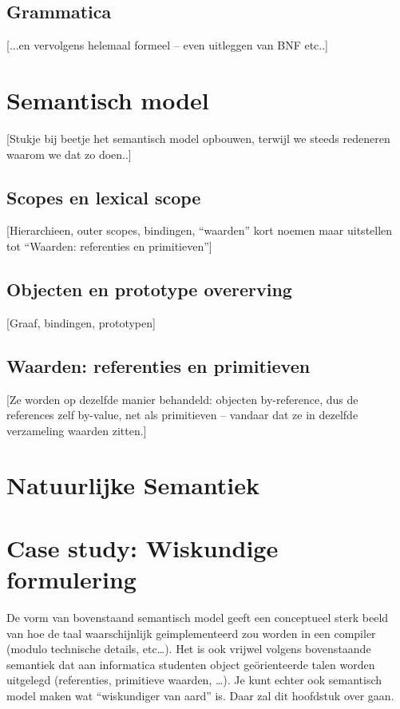 \documentclass[11pt,oneside,parskip=half]{scrbook}
\newcommand{\<}
  {\ensuremath{\langle}}
\renewcommand{\>}
  {\ensuremath{\rangle}}
\begin{document}

\section{Grammatica}

[...en vervolgens helemaal formeel -- even uitleggen van BNF etc..]

\chapter{Semantisch model}

[Stukje bij beetje het semantisch model opbouwen, terwijl we steeds redeneren waarom we dat zo doen..]

\section{Scopes en lexical scope}

[Hierarchieen, outer scopes, bindingen, ``waarden'' kort noemen maar uitstellen tot ``Waarden: referenties en primitieven'']

\section{Objecten en prototype overerving}

[Graaf, bindingen, prototypen]

\section{Waarden: referenties en primitieven}

[Ze worden op dezelfde manier behandeld: objecten by-reference, dus de references zelf by-value, net als primitieven -- vandaar dat ze in dezelfde verzameling waarden zitten.]

\chapter{Natuurlijke Semantiek}

\chapter{Case study: Wiskundige formulering}

De vorm van bovenstaand semantisch model geeft een conceptueel sterk beeld van hoe de taal waarschijnlijk geimplementeerd zou worden in een compiler (modulo technische details, etc\dots). Het is ook vrijwel volgens bovenstaande semantiek dat aan informatica studenten object geörienteerde talen worden uitgelegd (referenties, primitieve waarden, \dots). Je kunt echter ook semantisch model maken wat ``wiskundiger van aard'' is. Daar zal dit hoofdstuk over gaan.
\end{document}
